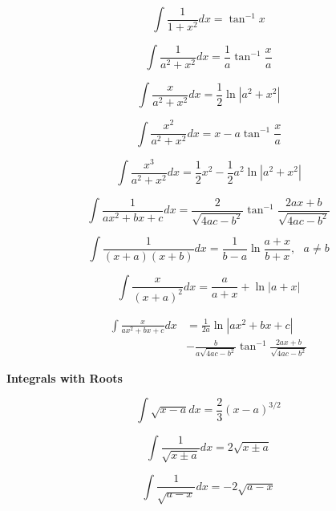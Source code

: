 \documentclass[11pt,twoside]{article}
\begin{document}
\begin{multicols}{3}
\begin{footnotesize}
\begin{equation}
\int \frac{1}{1+x^2}dx = \tan^{-1}x
\end{equation}

\begin{equation}
\int \frac{1}{a^2+x^2}dx = \frac{1}{a}\tan^{-1}\frac{x}{a}
\end{equation}

\begin{equation}
\int \frac{x}{a^2+x^2}dx = \frac{1}{2}\ln|a^2+x^2|
\end{equation}

\begin{equation}
\int \frac{x^2}{a^2+x^2}dx = x-a\tan^{-1}\frac{x}{a}
\end{equation}

\begin{equation}
\int \frac{x^3}{a^2+x^2}dx = \frac{1}{2}x^2-\frac{1}{2}a^2\ln|a^2+x^2|
\end{equation}

\begin{equation}
\int \frac{1}{ax^2+bx+c}dx = \frac{2}{\sqrt{4ac-b^2}}\tan^{-1}\frac{2ax+b}{\sqrt{4ac-b^2}}
\end{equation}

\begin{equation}
\int \frac{1}{(x+a)(x+b)}dx = \frac{1}{b-a}\ln\frac{a+x}{b+x}, \text{ } a\ne b
\end{equation}

\begin{equation}
\int \frac{x}{(x+a)^2}dx = \frac{a}{a+x}+\ln |a+x|
\end{equation}


\begin{align}
\int \frac{x}{ax^2+bx+c}dx &= \frac{1}{2a}\ln|ax^2+bx+c| \nonumber
\\&-\frac{b}{a\sqrt{4ac-b^2}}\tan^{-1}\frac{2ax+b}{\sqrt{4ac-b^2}}
\end{align}
\begin{center} \textbf{Integrals with Roots} \end{center}

\begin{equation}
\int \sqrt{x-a} dx = \frac{2}{3}(x-a)^{3/2}
\end{equation}

\begin{equation}
\int \frac{1}{\sqrt{x\pm a}} dx = 2\sqrt{x\pm a} 
\end{equation}

\begin{equation}
\int \frac{1}{\sqrt{a-x}} dx = -2\sqrt{a-x} 
\end{equation}


\end{footnotesize}
\end{multicols}
\end{document}
